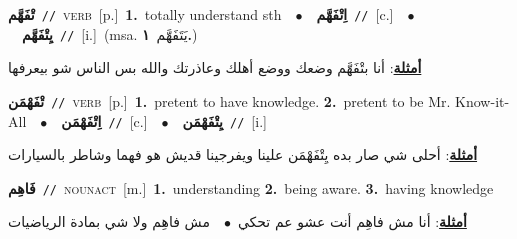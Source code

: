 \documentclass[10pt,a4paper,twoside]{article} %
\begin{document}
\begin{multicols}{2}
{\setlength\topsep{0pt}\textbf{\foreignlanguage{arabic}{تْفَهَّم}}\ {\color{gray}\texttt{//}\color{black}}\ \textsc{verb}\ [p.]\ \textbf{1.}~totally understand sth\ \ $\bullet$\ \ \setlength\topsep{0pt}\textbf{\foreignlanguage{arabic}{اِتْفَهَّم}}\ {\color{gray}\texttt{//}\color{black}}\ [c.]\ \ $\bullet$\ \ \setlength\topsep{0pt}\textbf{\foreignlanguage{arabic}{يِتْفَهَّم}}\ {\color{gray}\texttt{//}\color{black}}\ [i.]\ \color{gray}(msa. \foreignlanguage{arabic}{يَتَفَهَّم}~\foreignlanguage{arabic}{\textbf{١.}})\color{black}\  \begin{flushright}\color{gray}\foreignlanguage{arabic}{\textbf{\underline{\foreignlanguage{arabic}{أمثلة}}}: أنا بتْفَهَّم وضعك ووضع أهلك وعاذرتك والله بس الناس شو بيعرفها}\end{flushright}\color{black}} \vspace{2mm}

{\setlength\topsep{0pt}\textbf{\foreignlanguage{arabic}{تْفَهْمَن}}\ {\color{gray}\texttt{//}\color{black}}\ \textsc{verb}\ [p.]\ \textbf{1.}~pretent to have knowledge.  \textbf{2.}~pretent to be Mr. Know-it-All\ \ $\bullet$\ \ \setlength\topsep{0pt}\textbf{\foreignlanguage{arabic}{اِتْفَهْمَن}}\ {\color{gray}\texttt{//}\color{black}}\ [c.]\ \ $\bullet$\ \ \setlength\topsep{0pt}\textbf{\foreignlanguage{arabic}{يِتْفَهْمَن}}\ {\color{gray}\texttt{//}\color{black}}\ [i.]\  \begin{flushright}\color{gray}\foreignlanguage{arabic}{\textbf{\underline{\foreignlanguage{arabic}{أمثلة}}}: أحلى شي صار بده يِتْفَهْمَن علينا ويفرجينا قديش هو فهما وشاطر بالسيارات}\end{flushright}\color{black}} \vspace{2mm}

{\setlength\topsep{0pt}\textbf{\foreignlanguage{arabic}{فَاهِم}}\ {\color{gray}\texttt{//}\color{black}}\ \textsc{noun\textunderscore act}\ [m.]\ \textbf{1.}~understanding  \textbf{2.}~being aware.  \textbf{3.}~having knowledge\  \begin{flushright}\color{gray}\foreignlanguage{arabic}{\textbf{\underline{\foreignlanguage{arabic}{أمثلة}}}: أنا مش فاهِم أنت عشو عم تحكي\ $\bullet$\ \  مش فاهِم ولا شي بمادة الرياضيات}\end{flushright}\color{black}} \vspace{2mm}


\end{multicols}
\end{document}
